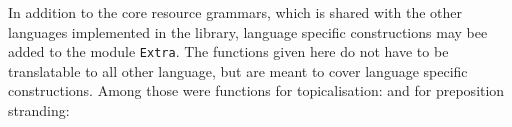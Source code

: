 \documentclass{report}
\begin{document}
In addition to the core resource grammars, which is shared with the other languages implemented in the
library, 
 language specific constructions may bee added
to the module \verb|Extra|. The functions given here do not have to be translatable
to all other language, but are meant to cover language specific constructions.
Among those were functions for topicalisation: %
\label{gfSwe:apple}
and for preposition stranding:





\end{document}
